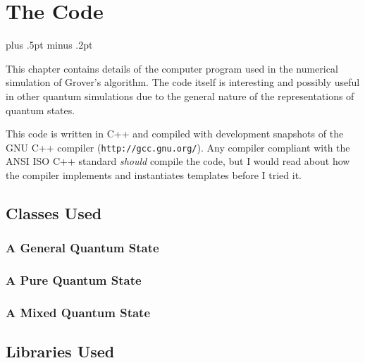

\chapter{The Code}
\label{chap:code}

\baselineskip=15.5pt plus .5pt minus .2pt

This chapter contains details of the computer program used
in the numerical simulation of Grover's algorithm.
The code itself is interesting and possibly useful in
other quantum simulations due to the general nature of the
representations of quantum states.

This code is written in C++ and compiled with development
snapshots of the GNU C++ compiler (\texttt{http://gcc.gnu.org/}).
Any compiler compliant with the ANSI ISO C++ standard \emph{should}
compile the code, but I would read about how the compiler implements
and instantiates templates before I tried it.


\section{Classes Used}

\subsection{A General Quantum State}
\subsection{A Pure Quantum State}
\subsection{A Mixed Quantum State}
\label{ssec:mixedstate}


\section{Libraries Used}

